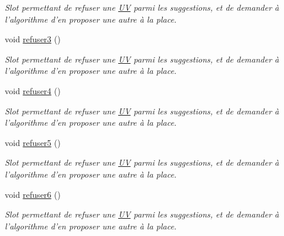 \begin{DoxyCompactItemize}
\begin{DoxyCompactList}\small\item\em Slot permettant de refuser une \hyperlink{class_u_v}{U\-V} parmi les suggestions, et de demander à l'algorithme d'en proposer une autre à la place. \end{DoxyCompactList}\item 
\hypertarget{class_completion_profil_window_ad30b74a40d832022170ec38bf933465a}{void \hyperlink{class_completion_profil_window_ad30b74a40d832022170ec38bf933465a}{refuser3} ()}\label{class_completion_profil_window_ad30b74a40d832022170ec38bf933465a}

\begin{DoxyCompactList}\small\item\em Slot permettant de refuser une \hyperlink{class_u_v}{U\-V} parmi les suggestions, et de demander à l'algorithme d'en proposer une autre à la place. \end{DoxyCompactList}\item 
\hypertarget{class_completion_profil_window_ac9f7cdc86e6a4891898f5b6c34e9e3c1}{void \hyperlink{class_completion_profil_window_ac9f7cdc86e6a4891898f5b6c34e9e3c1}{refuser4} ()}\label{class_completion_profil_window_ac9f7cdc86e6a4891898f5b6c34e9e3c1}

\begin{DoxyCompactList}\small\item\em Slot permettant de refuser une \hyperlink{class_u_v}{U\-V} parmi les suggestions, et de demander à l'algorithme d'en proposer une autre à la place. \end{DoxyCompactList}\item 
\hypertarget{class_completion_profil_window_abeca09ee116c6960e5535ab724d6ad8a}{void \hyperlink{class_completion_profil_window_abeca09ee116c6960e5535ab724d6ad8a}{refuser5} ()}\label{class_completion_profil_window_abeca09ee116c6960e5535ab724d6ad8a}

\begin{DoxyCompactList}\small\item\em Slot permettant de refuser une \hyperlink{class_u_v}{U\-V} parmi les suggestions, et de demander à l'algorithme d'en proposer une autre à la place. \end{DoxyCompactList}\item 
\hypertarget{class_completion_profil_window_ad1dd6d8ba2e161d2cf8bc0deaeddb46b}{void \hyperlink{class_completion_profil_window_ad1dd6d8ba2e161d2cf8bc0deaeddb46b}{refuser6} ()}\label{class_completion_profil_window_ad1dd6d8ba2e161d2cf8bc0deaeddb46b}

\begin{DoxyCompactList}\small\item\em Slot permettant de refuser une \hyperlink{class_u_v}{U\-V} parmi les suggestions, et de demander à l'algorithme d'en proposer une autre à la place. \end{DoxyCompactList}\end{DoxyCompactItemize}
